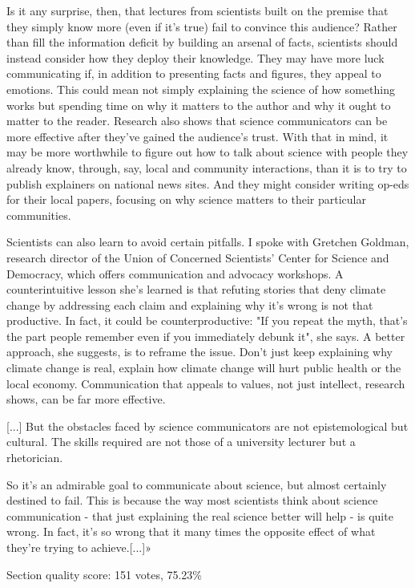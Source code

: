 	Is it any surprise, then, that lectures from scientists built on the premise that they simply know more (even if it's true) fail to convince this audience? Rather than fill the information deficit by building an arsenal of facts, scientists should instead consider how they deploy their knowledge. They may have more luck communicating if, in addition to presenting facts and figures, they appeal to emotions. This could mean not simply explaining the science of how something works but spending time on why it matters to the author and why it ought to matter to the reader. Research also shows that science communicators can be more effective after they've gained the audience's trust. With that in mind, it may be more worthwhile to figure out how to talk about science with people they already know, through, say, local and community interactions, than it is to try to publish explainers on national news sites. And they might consider writing op-eds for their local papers, focusing on why science matters to their particular communities.

	Scientists can also learn to avoid certain pitfalls. I spoke with Gretchen Goldman, research director of the Union of Concerned Scientists' Center for Science and Democracy, which offers communication and advocacy workshops. A counterintuitive lesson she's learned is that refuting stories that deny climate change by addressing each claim and explaining why it's wrong is not that productive. In fact, it could be counterproductive: "If you repeat the myth, that's the part people remember even if you immediately debunk it", she says. A better approach, she suggests, is to reframe the issue. Don't just keep explaining why climate change is real, explain how climate change will hurt public health or the local economy. Communication that appeals to values, not just intellect, research shows, can be far more effective.

	[...] But the obstacles faced by science communicators are not epistemological but cultural. The skills required are not those of a university lecturer but a rhetorician.

	So it's an admirable goal to communicate about science, but almost certainly destined to fail. This is because the way most scientists think about science communication - that just explaining the real science better will help - is quite wrong. In fact, it's so wrong that it many times the opposite effect of what they're trying to achieve.[...]»
	
	\begin{flushright}
	Section quality score:  151 votes, 75.23\%
	\end{flushright}